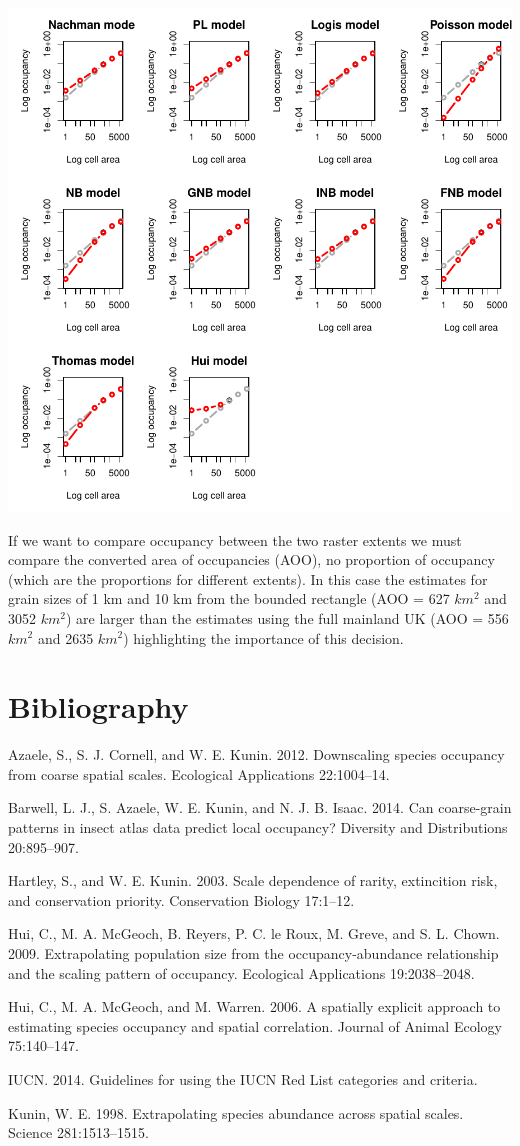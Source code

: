 \documentclass{article}[12pt, a4paper]
\begin{document}
\includegraphics{Downscaling-downscale42}

If we want to compare occupancy between the two raster extents we must compare the converted area of occupancies (AOO), no proportion of occupancy (which are the proportions for different extents). In this case the estimates for grain sizes of 1 km and 10 km from the bounded rectangle (AOO = 627 $km^{2}$ and 3052 $km^{2}$) are larger than the estimates using the full mainland UK (AOO = 556 $km^{2}$ and 2635 $km^{2}$) highlighting the importance of this decision.

\section{Bibliography}

Azaele, S., S. J. Cornell, and W. E. Kunin. 2012. Downscaling species occupancy from coarse spatial scales. Ecological Applications 22:1004–14.

Barwell, L. J., S. Azaele, W. E. Kunin, and N. J. B. Isaac. 2014. Can coarse-grain patterns in insect atlas data predict local occupancy? Diversity and Distributions 20:895–907.

Hartley, S., and W. E. Kunin. 2003. Scale dependence of rarity, extincition risk, and conservation priority. Conservation Biology 17:1–12.

Hui, C., M. A. McGeoch, B. Reyers, P. C. le Roux, M. Greve, and S. L. Chown. 2009. Extrapolating population size from the occupancy-abundance relationship and the scaling pattern of occupancy. Ecological Applications 19:2038–2048.

Hui, C., M. A. McGeoch, and M. Warren. 2006. A spatially explicit approach to estimating species occupancy and spatial correlation. Journal of Animal Ecology 75:140–147.

IUCN. 2014. Guidelines for using the IUCN Red List categories and criteria.

Kunin, W. E. 1998. Extrapolating species abundance across spatial scales. Science 281:1513–1515.
\end{document}
